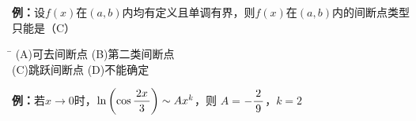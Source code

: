 
{\bf 例：}设$f(x)$在$(a,b)$内均有定义且单调有界，则$f(x)$在$(a,b)$内的间断点类型只能是（C）
\begin{tabbing}
	\hspace{8cm}\=\kill
	\quad\quad\quad
	(A)\;可去间断点 \> 
	(B)\;第二类间断点 \\ 
	\quad\quad\quad
	(C)\;跳跃间断点\>
	(D)\;不能确定
\end{tabbing}

{\bf 例：}若$x\to 0$时，$\ln\left(\cos\displaystyle\frac{\,{2x}\,}{\,{3}\,}\right)\sim Ax^k$，则
$A=$\underline{$-\displaystyle\frac{\,{2}\,}{\,{9}\,}$}，$k=$\underline{$2$}

